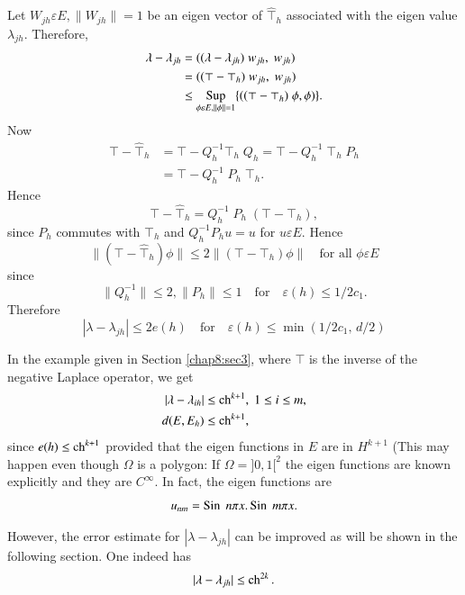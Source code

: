 Let $W_{jh}\varepsilon E, \parallel W_{jh}\parallel =1$ be an eigen
vector of $\hat{\top}_h$ associated with the eigen value
$\lambda_{jh}$. Therefore,
\begin{align*}
\lambda-\lambda_{jh} &= ((\lambda-\lambda_{jh})\;w_{jh},\;w_{jh})\\
&= ((\top-\top_h)\;w_{jh},\;w_{jh})\\
&\leq \underset{\phi\varepsilon E,\parallel\phi\parallel=1}{\operatorname{Sup}}
\{((\top -\top_h)\;\phi,\phi)\}.
\end{align*}
Now 
\begin{align*}
\top -\hat{\top}_h &=\top-Q_h^{-1}\top_h\;Q_h=\top-Q_h^{-1}\;\top_h\;
P_h\\ 
&= \top-Q_h^{-1} \;P_h \;\top_h.
\end{align*}
Hence
\begin{equation}\label{chap8:eq8.16}
\top-\hat{\top}_h=Q_h^{-1}\;P_h\;(\top-\top_h),
\end{equation}
since $P_h$ commutes with $\top_h$ and $Q_h^{-1}P_hu=u$ for
$u\varepsilon E$. Hence 
$$
\parallel (\top-\hat{\top}_h)\phi\parallel\leq 2\parallel
(\top-\top_h)\phi \parallel\quad\text{for all }\phi \varepsilon E
$$
since 
$$
\parallel Q_h^{-1}\parallel \leq 2,\parallel P_h\parallel \leq 1\quad
\text{for}\quad\varepsilon(h)\leq 1/2c_1.
$$\pageoriginale
Therefore
\begin{equation}\label{chap8:eq8.17}
|\lambda-\lambda_{jh}|\leq 2e(h)\quad\text{for}\quad\varepsilon(h)
\leq\min(1/2c_1, \,d/2)
\end{equation}

 In the example given in Section \ref{chap8:sec3},
where $\top$ is the inverse of the negative Laplace operator, we get 
\begin{align}
|\lambda-\lambda_{ih}| &\leq \operatorname{ch}^{k+1}, \;1\leq i\leq
m, \label{chap8:eq8.18}\\
d(E, E_h) &\leq \operatorname{ch}^{k+1}, \label{chap8:eq8.19}
\end{align}
since $e(h)\leq\operatorname{ch}^{k+1}$ provided that the eigen functions in $E$ are
in $H^{k+1}$ (This may happen even though $\Omega$ is a polygon: If
$\Omega =]0,1[^2$ the eigen functions are known explicitly and they
are $C^\infty$. In fact, the eigen functions are 
$$
u_{nm}=\operatorname{Sin} \;n\pi x.\operatorname{Sin} \;m\pi x.
$$

However, the error estimate for $|\lambda-\lambda_{jh}|$ can be
improved as will be shown in the following section. One indeed has 
$$
|\lambda-\lambda_{jh}|\leq\operatorname{ch}^{2k}.
$$

